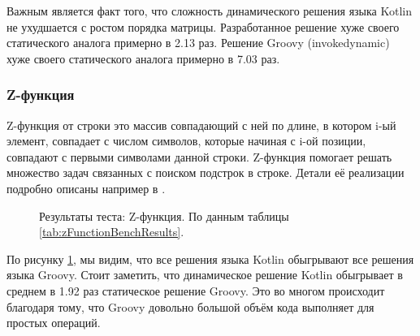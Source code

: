 Важным является факт того, что сложность динамического решения языка Kotlin не ухудшается с ростом порядка матрицы. Разработанное решение хуже своего статического аналога примерно в 2.13 раз. Решение Groovy (invokedynamic) хуже своего статического аналога примерно в 7.03 раз.

\subsubsection{Z-функция}


Z-функция от строки это массив совпадающий с ней по длине, в котором i-ый элемент, совпадает с числом символов, которые начиная с i-ой позиции, совпадают с первыми символами данной строки. Z-функция помогает решать множество задач связанных с поиском подстрок в строке.
Детали её реализации подробно описаны например в \cite{algo:gusfield1997algorithms}.


\begin{figure}
\caption{\label{graph:zFunctionBenchResults}Результаты теста: Z-функция. По данным таблицы \ref{tab:zFunctionBenchResults}.}
\end{figure}

По рисунку \ref{graph:zFunctionBenchResults}, мы видим, что все решения языка Kotlin обыгрывают все решения языка Groovy. Стоит заметить, что динамическое решение Kotlin обыгрывает в среднем в 1.92 раз статическое решение Groovy. Это во многом происходит благодаря тому, что Groovy довольно большой объём кода выполняет для простых операций.

